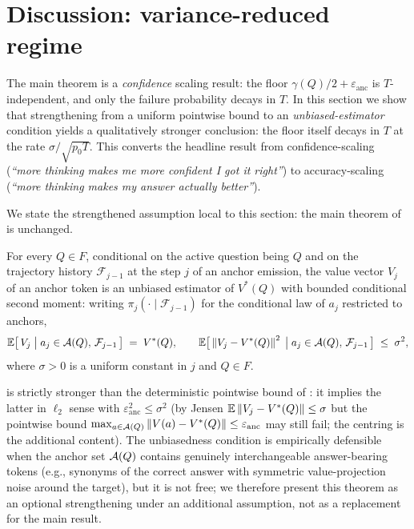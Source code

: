 \section{Discussion: variance-reduced regime}
\label{sec:variance_reduced}

The main theorem  is a \emph{confidence}
scaling result: the floor $\gamma(Q)/2 + \varepsilon_{\mathrm{anc}}$ is
$T$-independent, and only the failure probability decays in $T$. In
this section we show that strengthening
 from a uniform pointwise bound to an
\emph{unbiased-estimator} condition yields a qualitatively stronger
conclusion: the floor itself decays in $T$ at the rate $\sigma / \sqrt{p_0 T}$.
This converts the headline result from confidence-scaling
(\emph{``more thinking makes me more confident I got it right''}) to
accuracy-scaling (\emph{``more thinking makes my answer actually
better''}).

We state the strengthened assumption local to this section: the main
theorem of  is unchanged.

\begin{assumption}\label{ass:anchor_unbiased}
For every $Q \in F$, conditional on the active question being $Q$ and on
the trajectory history $\mathcal F_{j-1}$ at the step $j$ of an anchor
emission, the value vector $V_j$ of an anchor token is an unbiased
estimator of $V^*(Q)$ with bounded conditional second moment: writing
$\pi_j(\cdot \mid \mathcal F_{j-1})$ for the conditional law of $a_j$
restricted to anchors,
\begin{align}\label{eq:anchor_unbiased}
   \mathbb{E}\bigl[\,V_j \;\big|\; a_j \in \mathcal{A}(Q),\, \mathcal F_{j-1}\,\bigr]
   \;=\; V^*(Q),
   \qquad
   \mathbb{E}\bigl[\,\left\| V_j - V^*(Q) \right\|^2 \;\big|\; a_j \in \mathcal{A}(Q),\, \mathcal F_{j-1}\,\bigr]
   \;\le\; \sigma^2,
\end{align}
where $\sigma > 0$ is a uniform constant in $j$ and $Q \in F$.
\end{assumption}

\begin{remark}\label{rem:anchor_unbiased_remark}
 is strictly stronger than the deterministic
pointwise bound of : it implies the latter
in $\ell_2$ sense with $\varepsilon_{\mathrm{anc}}^2 \le \sigma^2$
(by Jensen $\mathbb{E}\left\| V_j - V^*(Q) \right\| \le \sigma$ but the pointwise bound
$\max_{a \in \mathcal{A}(Q)} \left\| V(a) - V^*(Q) \right\| \le \varepsilon_{\mathrm{anc}}$
may still fail; the centring is the additional content). The
unbiasedness condition is empirically defensible when the anchor set
$\mathcal{A}(Q)$ contains genuinely interchangeable answer-bearing tokens
(e.g., synonyms of the correct answer with symmetric value-projection
noise around the target), but it is not free; we therefore present
this theorem as an optional strengthening under an additional
assumption, not as a replacement for the main result.
\end{remark}

